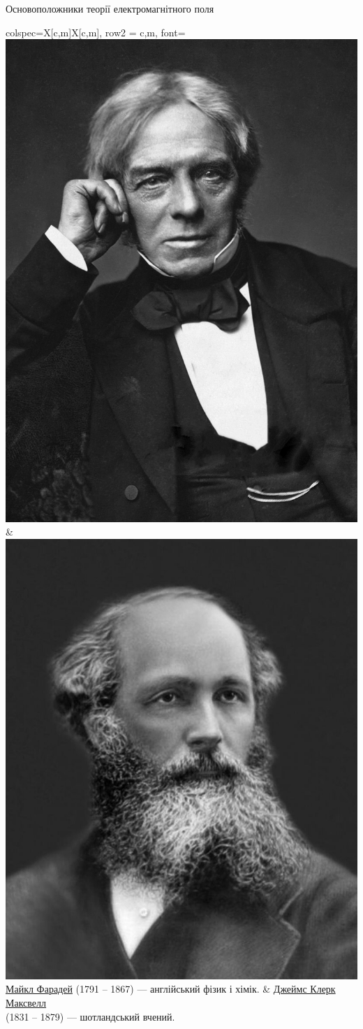 \documentclass{beamer}
\begin{document}
\begin{frame}{Основоположники теорії електромагнітного поля}{}
	\begin{tblr}{
		colspec={X[c,m]X[c,m]},
		row{2} = {c,m, font=\small}
		}
		\includegraphics[height=0.75\linewidth]{Faraday} & \includegraphics[height=0.75\linewidth]{Maxwell} \\
		\href{https://en.wikipedia.org/wiki/Michael_Faraday}{Майкл Фарадей} (1791 -- 1867) --- англійський фізик і хімік.
		                                                 &
		{\href{https://en.wikipedia.org/wiki/James_Clerk_Maxwell}{Джеймс Клерк Максвелл}\\ (1831 -- 1879) --- шотландський вчений.}
	\end{tblr}
\end{frame}
\end{document}
